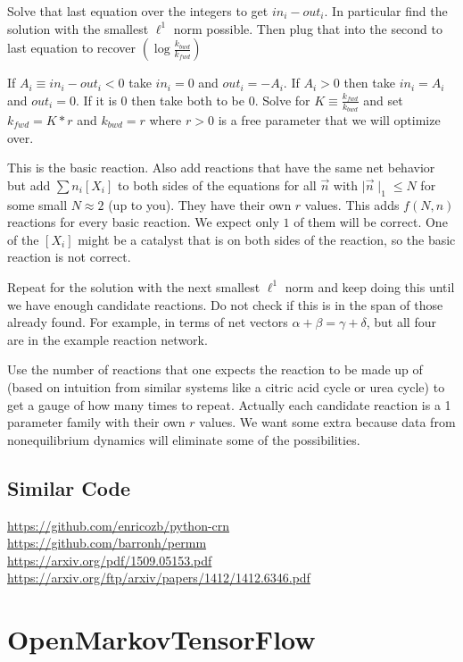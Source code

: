 \documentclass[11pt]{book}
\theoremstyle{change}
\theoremstyle{nonumberplain}
\numberwithin{equation}{section}
\newcommand\abs[1]{ \mid #1 \mid }
\begin{document}
Solve that last equation over the integers to get $in_i - out_i$. In particular find the solution with the smallest $\ell^1$ norm possible. Then plug that into the second to last equation to recover $(\log \frac{k_{bwd}}{k_{fwd}} )$

If $A_i \equiv in_i - out_i < 0$ take $in_i = 0$ and $out_i = -A_i$. If $A_i > 0$ then take $in_i = A_i$ and $out_i=0$. If it is $0$ then take both to be $0$. Solve for $K \equiv \frac{k_{fwd}}{k_{bwd}}$ and set $k_{fwd}=K*r$ and $k_{bwd}=r$ where $r>0$ is a free parameter that we will optimize over.

This is the basic reaction. Also add reactions that have the same net behavior but add $\sum n_i [X_i]$ to both sides of the equations for all $\vec{n}$ with $\abs{ \vec{n} }_1 \leq N$ for some small $N \approx 2$ (up to you). They have their own $r$ values. This adds $f(N,n)$ reactions for every basic reaction. We expect only $1$ of them will be correct. One of the $[X_i]$ might be a catalyst that is on both sides of the reaction, so the basic reaction is not correct.

Repeat for the solution with the next smallest $\ell^1$ norm and keep doing this until we have enough candidate reactions. Do not check if this is in the span of those already found. For example, in terms of net vectors $\alpha + \beta = \gamma + \delta$, but all four are in the example reaction network.

Use the number of reactions that one expects the reaction to be made up of (based on intuition from similar systems like a citric acid cycle or urea cycle) to get a gauge of how many times to repeat. Actually each candidate reaction is a 1 parameter family with their own $r$ values. We want some extra because data from nonequilibrium dynamics will eliminate some of the possibilities.

\section{Similar Code}

\url{https://github.com/enricozb/python-crn}\\
\url{https://github.com/barronh/permm}\\
\url{https://arxiv.org/pdf/1509.05153.pdf}\\
\url{https://arxiv.org/ftp/arxiv/papers/1412/1412.6346.pdf}

\chapter{OpenMarkovTensorFlow}
\end{document}
